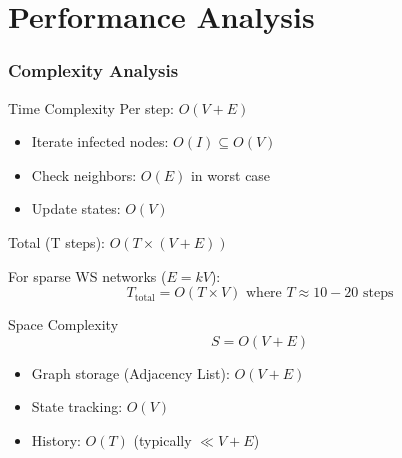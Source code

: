 \documentclass{beamer}
\begin{document}
\section{Performance Analysis}

\begin{frame}
\frametitle{Complexity Analysis}

\begin{block}{Time Complexity}
Per step: $O(V + E)$
\begin{itemize}
    \item Iterate infected nodes: $O(I) \subseteq O(V)$
    \item Check neighbors: $O(E)$ in worst case
    \item Update states: $O(V)$
\end{itemize}

Total (T steps): $\boxed{O(T \times (V + E))}$

For sparse WS networks ($E = kV$):
\begin{equation}
T_{\text{total}} = O(T \times V) \text{ where } T \approx 10-20 \text{ steps}
\end{equation}
\end{block}

\begin{block}{Space Complexity}
\begin{equation}
S = O(V + E)
\end{equation}
\begin{itemize}
    \item Graph storage (Adjacency List): $O(V+E)$
    \item State tracking: $O(V)$
    \item History: $O(T)$ (typically $\ll V+E$)
\end{itemize}
\end{block}
\end{frame}
\end{document}
